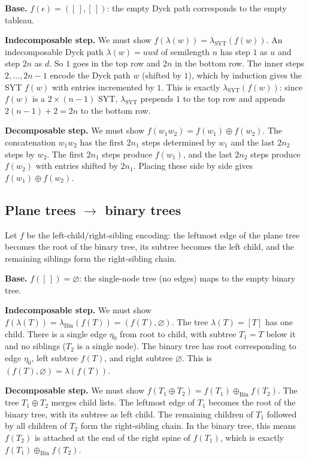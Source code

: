 \documentclass[a4paper,11pt]{article}
\theoremstyle{definition}
\begin{document}
\textbf{Base.}
$f(\epsilon) = ([\,], [\,])$: the empty Dyck path
corresponds to the empty tableau.

\textbf{Indecomposable step.}
We must show
$f(\lambda(w)) = \lambda_{\text{SYT}}(f(w))$.
An indecomposable Dyck path $\lambda(w) = uwd$ of
semilength $n$ has step $1$ as $u$ and step $2n$ as $d$.
So $1$ goes in the top row and $2n$ in the bottom row.
The inner steps $2, \ldots, 2n{-}1$ encode the Dyck path
$w$ (shifted by $1$), which by induction gives the SYT
$f(w)$ with entries incremented by $1$. This is exactly
$\lambda_{\text{SYT}}(f(w))$: since $f(w)$ is a
$2 \times (n{-}1)$ SYT, $\lambda_{\text{SYT}}$ prepends
$1$ to the top row and appends
$2(n{-}1){+}2 = 2n$ to the bottom row.

\textbf{Decomposable step.}
We must show
$f(w_1 w_2) = f(w_1) \oplus f(w_2)$.
The concatenation $w_1 w_2$ has the first $2n_1$ steps
determined by $w_1$ and the last $2n_2$ steps by $w_2$.
The first $2n_1$ steps produce $f(w_1)$, and the last
$2n_2$ steps produce $f(w_2)$ with entries shifted by
$2n_1$. Placing these side by side gives
$f(w_1) \oplus f(w_2)$.

\subsection{Plane trees $\to$ binary trees}\label{sec:bij-trees-binary}

Let $f$ be the left-child/right-sibling encoding: the
leftmost edge of the plane tree becomes the root of the
binary tree, its subtree becomes the left child, and the
remaining siblings form the right-sibling chain.

\textbf{Base.}
$f([\,]) = \varnothing$: the single-node tree (no edges)
maps to the empty binary tree.

\textbf{Indecomposable step.}
We must show
$f(\lambda(T)) = \lambda_{\text{Bin}}(f(T))
= (f(T), \varnothing)$.
The tree $\lambda(T) = [T]$ has one child. There is a
single edge $\eta_0$ from root to child, with subtree
$T_1 = T$ below it and no siblings ($T_2$ is a single
node). The binary tree has root corresponding to edge
$\eta_0$, left subtree $f(T)$, and right subtree
$\varnothing$. This is
$(f(T), \varnothing) = \lambda(f(T))$.

\textbf{Decomposable step.}
We must show
$f(T_1 \oplus T_2)
= f(T_1) \oplus_{\text{Bin}} f(T_2)$.
The tree $T_1 \oplus T_2$ merges child lists. The
leftmost edge of $T_1$ becomes the root of the binary
tree, with its subtree as left child. The remaining
children of $T_1$ followed by all children of $T_2$ form
the right-sibling chain. In the binary tree, this means
$f(T_2)$ is attached at the end of the right spine of
$f(T_1)$, which is exactly
$f(T_1) \oplus_{\text{Bin}} f(T_2)$.
\end{document}
